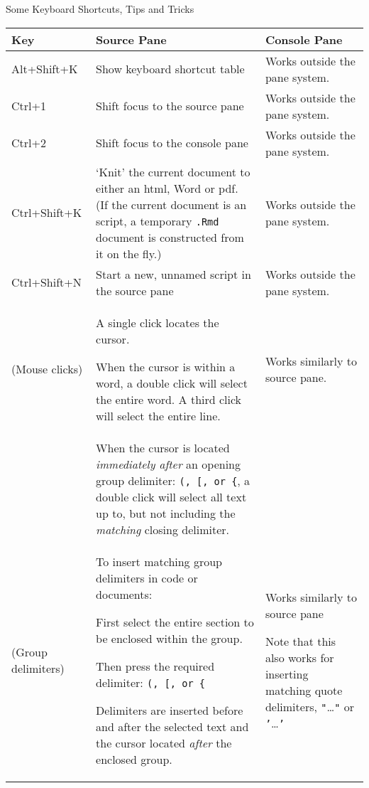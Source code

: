 \documentclass[10.5pt]{article}
\begin{document}
\begin{center}
  \Large Some \RStudio  Keyboard Shortcuts, Tips and Tricks
\end{center}


\begin{xltabular}{1.0\linewidth}[!htp]{@{}lXX@{}}
  \toprule
  \textbf{Key} & \textbf{Source Pane} & \textbf{Console Pane}\\
  \midrule Alt+Shift+K & Show keyboard shortcut table &
  Works outside the pane system.\\
  Ctrl+1 & Shift focus to the source pane&
  Works outside  the pane system.\\
  Ctrl+2 & Shift focus to the console pane& Works outside
  the pane system.\\
  Ctrl+Shift+K & `Knit' the current document to either an html, Word
  or pdf.  (If the current document is an \R script, a temporary
  \texttt{.Rmd} document is constructed from it on the fly.)  & Works
  outside the pane system.\\
  Ctrl+Shift+N & Start a new, unnamed \R script in the source pane&
  Works outside the   pane system.\\
  (Mouse clicks) & A single click locates the cursor.\par
  When the cursor is within a word, a double click will select the
  entire word.  A third click will select the entire line. & Works
  similarly to source pane.\\
  & When the cursor is located \emph{immediately after} an opening
  group delimiter: \texttt{(, [, or \{}, a double click will select
  all text up to, but not including the \emph{matching} closing
  delimiter. & \\
  (Group delimiters) & To insert matching group delimiters in code or
  documents:\par
  First select the entire section to be enclosed within the group.\par
  Then press the required delimiter: \texttt{(, [, or \{}\par
  Delimiters are inserted before and after the selected text and the
  cursor located \emph{after} the enclosed group.& Works similarly to
  source pane\par
  Note that this also works for inserting matching quote delimiters,
  \texttt{"}\dots\texttt{"} or \texttt{'}\dots\texttt{'}\\

\end{xltabular}
\end{document}
